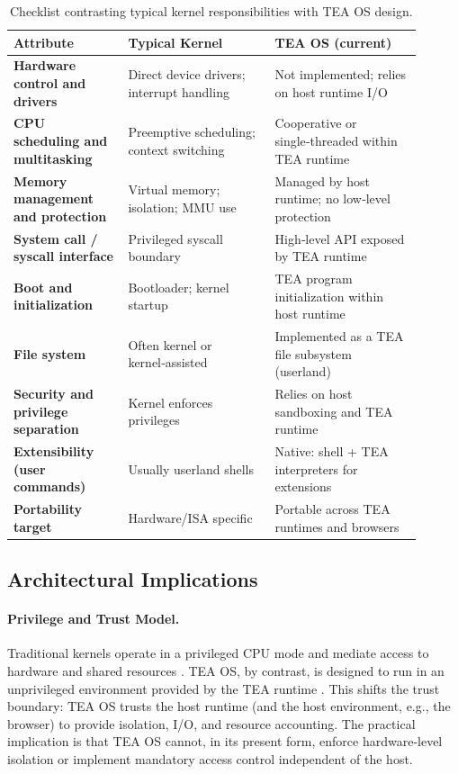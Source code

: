 \documentclass{article}
\begin{document}
\begin{table}[h]
\centering
\begin{tabular}{>{\bfseries}m{0.25\linewidth} | m{0.325\linewidth} | m{0.325\linewidth}} %
\hline
\textbf{Attribute} & \textbf{Typical Kernel} & \textbf{TEA OS (current)} \\ \hline
Hardware control and drivers & Direct device drivers; interrupt handling & Not implemented; relies on host runtime I/O \\ \hline
CPU scheduling and multitasking & Preemptive scheduling; context switching & Cooperative or single‑threaded within TEA runtime \\ \hline
Memory management and protection & Virtual memory; isolation; MMU use & Managed by host runtime; no low‑level protection \\ \hline
System call / syscall interface & Privileged syscall boundary & High‑level API exposed by TEA runtime \\ \hline
Boot and initialization & Bootloader; kernel startup & TEA program initialization within host runtime \\ \hline
File system & Often kernel or kernel‑assisted & Implemented as a TEA file subsystem (userland) \\ \hline
Security and privilege separation & Kernel enforces privileges & Relies on host sandboxing and TEA runtime \\ \hline
Extensibility (user commands) & Usually userland shells & Native: shell + TEA interpreters for extensions \\ \hline
Portability target & Hardware/ISA specific & Portable across TEA runtimes and browsers \\ \hline
\end{tabular}
\caption{Checklist contrasting typical kernel responsibilities with TEA OS design.}
\label{tab:kernel-checklist}
\end{table}

\subsection{Architectural Implications}

\paragraph{Privilege and Trust Model.} Traditional kernels operate in a privileged CPU mode and mediate access to hardware and shared resources \cite{arpacidusseau2018ostep, kain1999advanced}. TEA OS, by contrast, is designed to run in an unprivileged environment provided by the TEA runtime \cite{Lutalo2024TEATAZ}. This shifts the trust boundary: TEA OS trusts the host runtime (and the host environment, e.g., the browser) to provide isolation, I/O, and resource accounting. The practical implication is that TEA OS cannot, in its present form, enforce hardware‑level isolation or implement mandatory access control independent of the host.
\end{document}
